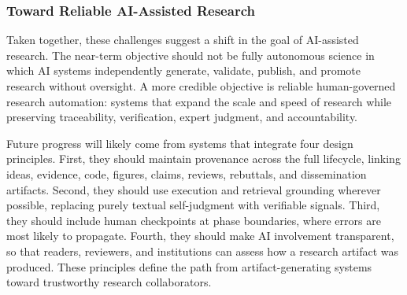 \subsubsection{Toward Reliable AI-Assisted Research}

Taken together, these challenges suggest a shift in the goal of AI-assisted research. The near-term objective should not be fully autonomous science in which AI systems independently generate, validate, publish, and promote research without oversight. A more credible objective is reliable human-governed research automation: systems that expand the scale and speed of research while preserving traceability, verification, expert judgment, and accountability.

Future progress will likely come from systems that integrate four design principles. First, they should maintain provenance across the full lifecycle, linking ideas, evidence, code, figures, claims, reviews, rebuttals, and dissemination artifacts. Second, they should use execution and retrieval grounding wherever possible, replacing purely textual self-judgment with verifiable signals. Third, they should include human checkpoints at phase boundaries, where errors are most likely to propagate. Fourth, they should make AI involvement transparent, so that readers, reviewers, and institutions can assess how a research artifact was produced. These principles define the path from artifact-generating systems toward trustworthy research collaborators.




